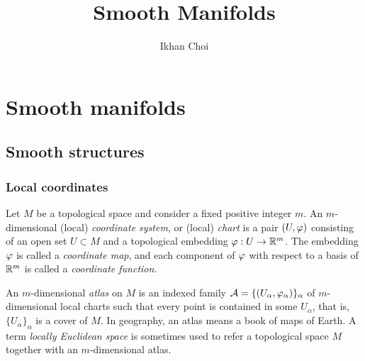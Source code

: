 \documentclass{../note}
\begin{document}
\title{Smooth Manifolds}
\author{Ikhan Choi}
\maketitle
\tableofcontents





\part{Smooth manifolds}


\chapter{Smooth structures}

\section{Local coordinates}


\begin{prb}[Atlases]
Let $M$ be a topological space and consider a fixed positive integer $m$.
An $m$-dimensional (local) \emph{coordinate system}, or (local) \emph{chart} is a pair $(U,\varphi)$ consisting of an open set $U\subset M$ and a topological embedding $\varphi:U\to\mathbb{R}^m$.
The embedding $\varphi$ is called a \emph{coordinate map}, and each component of $\varphi$ with respect to a basis of $\mathbb{R}^m$ is called a \emph{coordinate function}.

An $m$-dimensional \emph{atlas} on $M$ is an indexed family $\mathcal{A}=\{(U_\alpha,\varphi_\alpha)\}_\alpha$ of $m$-dimensional local charts such that every point is contained in some $U_\alpha$, that is, $\{U_\alpha\}_\alpha$ is a cover of $M$.
In geography, an atlas means a book of maps of Earth.
A term \emph{locally Euclidean space} is sometimes used to refer a topological space $M$ together with an $m$-dimensional atlas.
\begin{parts}
\item 
\end{parts}
\end{prb}
\end{document}
